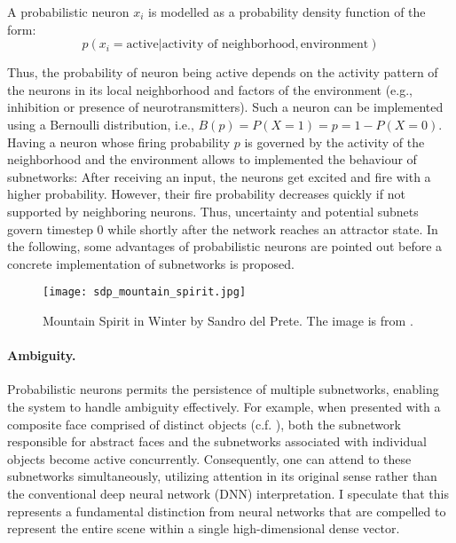 A probabilistic neuron $x_i$ is modelled as a probability density function of the form:
\begin{equation}
    p(x_i = \text{active} | \text{activity of neighborhood}, \text{environment}) 
\end{equation}

Thus, the probability of neuron being active depends on the activity pattern of the neurons in its local neighborhood and factors of the environment (e.g., inhibition or presence of neurotransmitters).
Such a neuron can be implemented using a Bernoulli distribution, i.e., $B(p) = P(X = 1) = p = 1 - P(X=0)$. Having a neuron whose firing probability $p$ is governed by the activity of the neighborhood and the environment allows to implemented the behaviour of subnetworks: After receiving an input, the neurons get excited and fire with a higher probability. However, their fire probability decreases quickly if not supported by neighboring neurons. Thus, uncertainty and potential subnets govern timestep 0 while shortly after the network reaches an attractor state. In the following, some advantages of probabilistic neurons are pointed out before a concrete implementation of subnetworks is proposed.


\begin{figure}[h]
    \centering
    \texttt{[image: sdp\_mountain\_spirit.jpg]}
    \caption[Mountain Spirit in Winter by Sandro del Prete]{Mountain Spirit in Winter by Sandro del Prete. The image is from .}
\end{figure}


\paragraph{Ambiguity.} Probabilistic neurons permits the persistence of multiple subnetworks, enabling the system to handle ambiguity effectively. For example, when presented with a composite face comprised of distinct objects (c.f. ), both the subnetwork responsible for abstract faces and the subnetworks associated with individual objects become active concurrently. Consequently, one can attend to these subnetworks simultaneously, utilizing attention in its original sense rather than the conventional deep neural network (DNN) interpretation. I speculate that this represents a fundamental distinction from neural networks that are compelled to represent the entire scene within a single high-dimensional dense vector.

